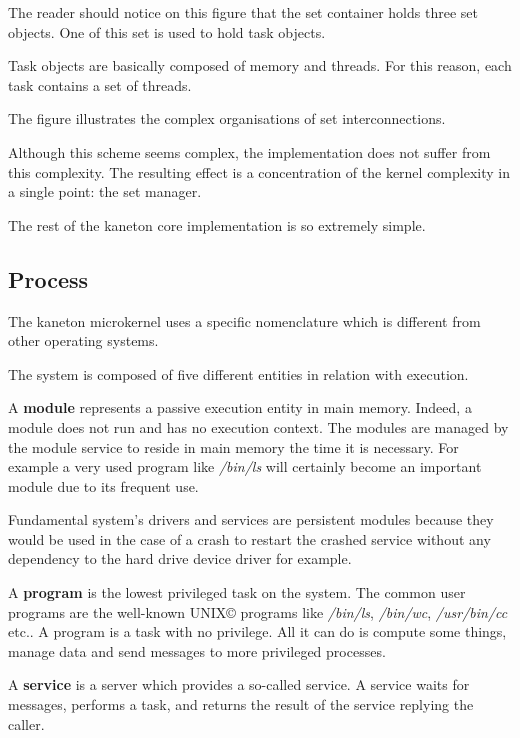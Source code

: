 \begin{multicols}{2}

The reader should notice on this figure that the set container holds
three set objects. One of this set is used to hold task objects.

Task objects are basically composed of memory and threads. For this
reason, each task contains a set of threads.

The figure illustrates the complex organisations of set interconnections.

Although this scheme seems complex, the implementation does not
suffer from this complexity. The resulting effect is a concentration
of the kernel complexity in a single point: the set manager.

The rest of the kaneton core implementation is so extremely simple.

%
%

\subsection{Process}

The kaneton microkernel uses a specific nomenclature which is different
from other operating systems.

The system is composed of five different entities in relation with execution.

A \textbf{module} represents a passive execution entity in main memory.
Indeed, a module does not run and has no execution context. The modules are
managed by the module service to reside in main memory the time it is
necessary. For example a very used program like \textit{/bin/ls} will
certainly become an important module due to its frequent use.

Fundamental system's drivers and services are persistent modules because
they would be used in the case of a crash to restart the crashed service
without any dependency to the hard drive device driver for example.

A \textbf{program} is the lowest privileged task on the system.
The common user programs are the well-known UNIX{\scriptsize \copyright}
programs like \textit{/bin/ls}, \textit{/bin/wc}, \textit{/usr/bin/cc} etc..
A program is a task with no privilege. All it can do is compute some things,
manage data and send messages to more privileged processes.

A \textbf{service} is a server which provides a so-called service. A service
waits for messages, performs a task, and returns the result of the service
replying the caller.


\end{multicols}
